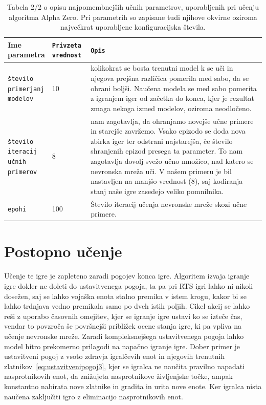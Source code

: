 \documentclass[a4paper, 12pt]{book}
\begin{document}
\begin{table}
	\begin{center}
		\begin{tabular}{p{0.15\linewidth}|p{0.15\linewidth}|p{0.7\linewidth}}
			Ime parametra                             & {\tt Privzeta vrednost} & {\tt Opis} \\ \hline

			{\tt število primerjanj modelov}  		  & 10 						& kolikokrat se bosta trenutni model k se uči in njegova prejšna različica pomerila med sabo, da se ohrani boljši.
																				  Naučena modela se med sabo pomerita z igranjem iger od začetka do konca, kjer je rezultat zmaga nekoga izmed modelov, oziroma neodločeno.\\
			{\tt število iteracij učnih primerov}     & 8 						& nam zagotavlja, da ohranjamo novejše učne primere in starejše zavržemo.
																				  Vsako epizodo se doda nova zbirka iger ter odstrani najstarejša, če število shranjenih epizod presega ta parameter.
																				  To nam zagotavlja dovolj svežo učno množico, nad katero se nevronska mreža uči.
																				  V našem primeru je bil nastavljen na manjšo vrednost (8), saj kodiranja stanj naše igre zasedejo veliko pomnilnika.\\
			{\tt epohi}     						  & 100 					& Število iteracij učenja nevronske mreže skozi učne primere.\\
		\end{tabular}
	\end{center}
	\caption{Tabela 2/2 o opisu najpomembnejših učnih parametrov, uporabljenih pri učenju algoritma Alpha Zero. Pri parametrih so zapisane tudi njihove okvirne oziroma največkrat uporabljene konfiguracijska števila.}
	\label{tableParameters2}
\end{table}



\section{Postopno učenje}
Učenje te igre je zapleteno zaradi pogojev konca igre. 
Algoritem izvaja igranje igre dokler ne doleti do ustavitvenega pogoja, ta pa pri RTS igri lahko ni nikoli dosežen, saj se lahko vojaška enota stalno premika v istem krogu, kakor bi se lahko trdnjava vedno premikala samo po dveh istih poljih.
Cikel akcij se lahko reši z uporabo časovnih omejitev, kjer se igranje igre ustavi ko se izteče čas, vendar to povzroča še površnejši približek ocene stanja igre, ki pa vpliva na učenje nevronske mreže.
Zaradi kompleksnejšega ustavitvenega pogoja lahko model hitro prekomerno prilagodi na napačno igranje igre.
Dober primer je ustavitveni pogoj z vsoto zdravja igralčevih enot in njegovih trenutnih zlatnikov~\ref{eq:ustavitvenipogoj3}, kjer se igralca ne naučita pravilno napadati nasprotnikovih enot, da znižujeta nasprotnikove življenjske točke, ampak konstantno nabirata nove zlatnike in gradita in urita nove enote.
Ker igralca nista naučena zaključiti igro z eliminacijo nasprotnikovih enot.
\end{document}
